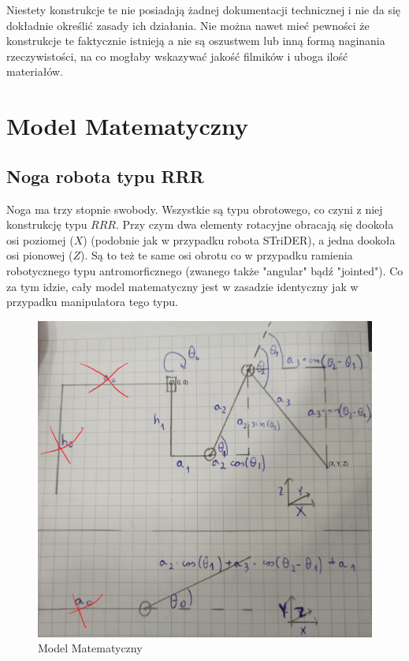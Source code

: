 \documentclass[a4paper,13pt]{article}
\begin{document}
Niestety konstrukcje te nie posiadają żadnej dokumentacji technicznej i nie da się dokładnie określić zasady ich działania. Nie można nawet mieć pewności że konstrukcje te faktycznie istnieją a nie są oszustwem lub inną formą naginania rzeczywistości, na co mogłaby wskazywać jakość filmików i uboga ilość materiałów.\\

\section{Model Matematyczny}

\subsection{Noga robota typu RRR}

Noga ma trzy stopnie swobody. Wszystkie są typu obrotowego, co czyni z niej konstrukcję typu $RRR$. Przy czym dwa elementy rotacyjne obracają się dookoła osi poziomej ($X$) (podobnie jak w przypadku robota STriDER), a jedna dookoła osi pionowej ($Z$). Są to też te same osi obrotu co w przypadku ramienia robotycznego typu antromorficznego (zwanego także "angular" bądź "jointed"). Co za tym idzie, cały model matematyczny jest w zasadzie identyczny jak w przypadku manipulatora tego typu.\\

\begin{figure}[H]
\includegraphics[width=\textwidth]{img/math_model.jpg}
\caption{Model Matematyczny}
\label{math_model}
\end{figure}
\end{document}
